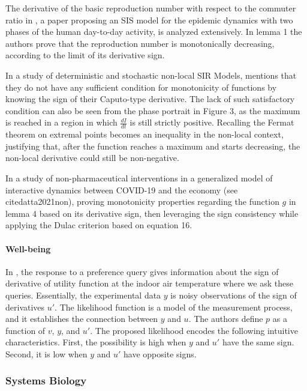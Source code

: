 \documentclass[11pt]{book}
\begin{document}
The derivative of the basic reproduction number with respect to the
commuter ratio in \cite{seno2020sis}, a paper proposing an SIS model for the epidemic dynamics with two phases of the human
day-to-day activity, is analyzed extensively. In
lemma 1 the authors prove that the reproduction number is monotonically
decreasing, according to the limit of its derivative sign.

In a study of deterministic and stochastic non-local
SIR Models, \cite{ascione2020construction} mentions that they do not have any
sufficient condition for monotonicity of functions by knowing the
sign of their Caputo-type derivative. The lack of such satisfactory
condition can also be seen from the phase portrait in Figure 3, as
the maximum is reached in a region in which $\frac{dI}{dt}$ is still
strictly positive. Recalling the Fermat theorem on extremal points
becomes an inequality in the non-local context, justifying that, after
the function reaches a maximum and starts decreasing, the non-local
derivative could still be non-negative.

In a study of non-pharmaceutical interventions in a generalized
model of interactive dynamics between COVID-19 and the economy (see cite{datta2021non}), proving monotonicity properties regarding
the function $g$ in lemma 4 based on its derivative sign, then leveraging
the sign consistency while applying the Dulac criterion based on equation
16.


\paragraph{Well-being}

In \cite{awalgaonkar2019learning}, the response to a preference query
gives information about the sign of derivative of utility function
at the indoor air temperature where we ask these queries. Essentially,
the experimental data $y$ is noisy observations of the sign of derivatives
$u'$. The likelihood function is a model of the measurement process,
and it establishes the connection between $y$ and $u$. The authors
define $p$ as a function of $v$, $y$, and $u'$. The proposed likelihood
encodes the following intuitive characteristics. First, the possibility
is high when $y$ and $u'$ have the same sign. Second, it is low
when $y$ and $u'$ have opposite signs.


\subsubsection{Systems Biology}
\end{document}
